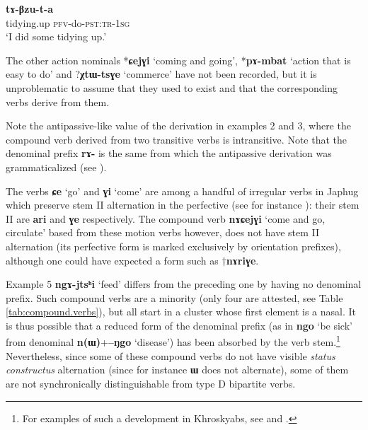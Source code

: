 \documentclass[oneside,a4paper,11pt]{article}
\newcommand{\ipa}[1]{{\phon\textbf{#1}}}
\newcommand{\jpg}[2]{\ipa{#1} `#2'}
\begin{document}
\begin{exe}
\ex 
 \gll \ipa{joʁβzɯr} \ipa{tɤ-βzu-t-a} \\
 tidying.up \textsc{pfv}-do-\textsc{pst:tr-1sg} \\
 \glt `I did some tidying up.'
\end{exe}

The other action nominals *\ipa{ɕejɣi} `coming and going', *\ipa{pɤ-mbat} `action that is easy to do' and ?\ipa{χtɯ-tsɣe} `commerce' have not been recorded, but it is unproblematic to assume that they used to exist and that the corresponding verbs derive from them.

Note the antipassive-like value of the derivation in examples 2 and 3, where the compound verb derived from two transitive verbs is intransitive. Note that the denominal prefix \ipa{rɤ-} is the same from which the antipassive derivation was grammaticalized (see  \citealt{jacques14antipassive}). 

The verbs \jpg{ɕe}{go} and \jpg{ɣi}{come} are among a handful of irregular verbs in Japhug which preserve stem II alternation in the perfective (see for instance \citealt[267]{jacques14linking}): their stem II are \ipa{ari} and \ipa{ɣe} respectively. The compound verb \jpg{nɤɕejɣi}{come and go, circulate} based from these motion verbs however, does not have stem II alternation (its perfective form is marked exclusively by orientation prefixes), although one could have expected a form such as $\dagger$\ipa{nɤriɣe}.

Example 5 \jpg{ngɤ-jtsʰi}{feed} differs from the preceding one by having no denominal prefix. Such compound verbs are a minority (only four are attested, see Table \ref{tab:compound.verbs}), but all start in a cluster whose first element is a nasal. It is thus possible that a reduced form of the denominal prefix (as in \jpg{ngo}{be sick} from denominal \ipa{n(ɯ)}+\jpg{--ŋgo}{disease}) has been absorbed by the verb stem.\footnote{For examples of such a development in Khroskyabs, see \citet{jacques12incorp} and \citealt{lai13affixale}. } Nevertheless, since some of these compound verbs do not have visible \textit{status constructus} alternation (since for instance \ipa{ɯ} does not alternate), some of them are not synchronically distinguishable from type D bipartite verbs.
\end{document}
